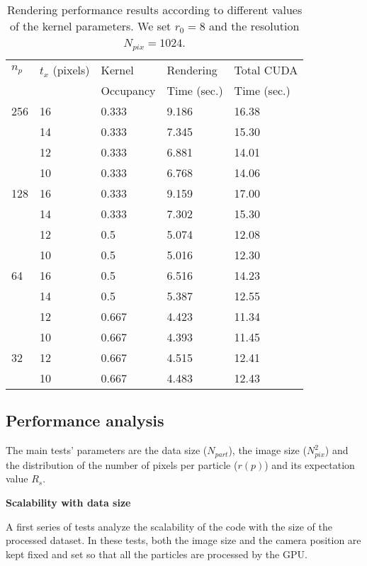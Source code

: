\documentclass[11pt]{article}
\begin{document}
\begin{table}
\caption{Rendering performance results according to different values of the kernel parameters. We set $r_0=8$ and the resolution $N_{pix}=1024$.}
\begin{center}
\begin{tabular}{|l|l|l|l|l|}
\hline
$n_p$ & $t_x$ (pixels) & Kernel & Rendering & Total CUDA \\
& & Occupancy & Time (sec.) & Time (sec.) \\
\hline
256   & 16 & 0.333 & 9.186 & 16.38 \\
\hline
      & 14 & 0.333 & 7.345  & 15.30 \\
\hline
      & 12 & 0.333 & 6.881  & 14.01 \\
\hline
      & 10 & 0.333 & 6.768 & 14.06 \\
\hline
128   & 16 & 0.333 & 9.159 & 17.00 \\
\hline
      & 14 & 0.333 & 7.302  & 15.30 \\
\hline
      & 12 & 0.5 & 5.074  & 12.08 \\
\hline
      & 10 & 0.5 & 5.016 & 12.30 \\ 
\hline
64    & 16 & 0.5 & 6.516 & 14.23 \\
\hline
      & 14 & 0.5 & 5.387 & 12.55 \\
\hline
      & 12 & 0.667 & 4.423 & 11.34 \\
\hline
      & 10 & 0.667 & 4.393 & 11.45 \\ 
\hline
32    & 12 & 0.667 & 4.515 & 12.41 \\
\hline
      & 10 & 0.667 & 4.483 & 12.43 \\ 
\hline
\end{tabular}
\end{center}
\label{tab:tuning}
\end{table}

\subsection{Performance analysis}
\label{sec:performance}

The main tests' parameters are the data size ($N_{part}$),
the image size ($N_{pix}^2$) and the distribution of the number of pixels 
per particle ($r(p)$) and its expectation value $R_s$.

\medskip
\noindent 
{\bf Scalability with data size}

\noindent
A first series of tests analyze the scalability of the code
with the size of the processed dataset. In these tests, both the image size
and the camera position are kept fixed and set so that all the particles are processed 
by the GPU.
\end{document}
